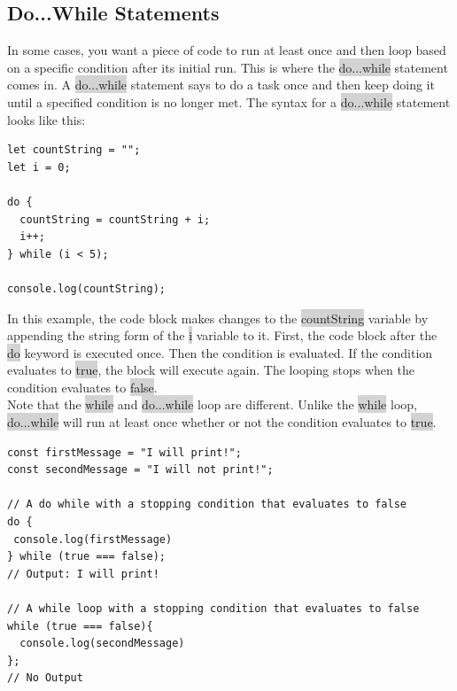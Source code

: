 \documentclass[11pt]{article}
\begin{document}
\subsection{Do...While Statements}
In some cases, you want a piece of code to run at least once and then loop based on a specific condition after its initial run. This is where the \colorbox{lightgray}{do...while} statement comes in. A \colorbox{lightgray}{do...while} statement says to do a task once and then keep doing it until a specified condition is no longer met. The syntax for a \colorbox{lightgray}{do...while} statement looks like this:
\begin{lstlisting}
let countString = "";
let i = 0;

do {
  countString = countString + i;
  i++;
} while (i < 5);

console.log(countString);
\end{lstlisting}
In this example, the code block makes changes to the \colorbox{lightgray}{countString} variable by appending the string form of the \colorbox{lightgray}{i} variable to it. First, the code block after the \colorbox{lightgray}{do} keyword is executed once. Then the condition is evaluated. If the condition evaluates to \colorbox{lightgray}{true}, the block will execute again. The looping stops when the condition evaluates to \colorbox{lightgray}{false}. \\
\newline
Note that the \colorbox{lightgray}{while} and \colorbox{lightgray}{do...while} loop are different. Unlike the \colorbox{lightgray}{while} loop, \colorbox{lightgray}{do...while} will run at least once whether or not the condition evaluates to \colorbox{lightgray}{true}.
\begin{lstlisting}
const firstMessage = "I will print!";
const secondMessage = "I will not print!"; 

// A do while with a stopping condition that evaluates to false
do {
 console.log(firstMessage)
} while (true === false);
// Output: I will print! 

// A while loop with a stopping condition that evaluates to false
while (true === false){
  console.log(secondMessage)
};
// No Output 
\end{lstlisting}
\end{document}
